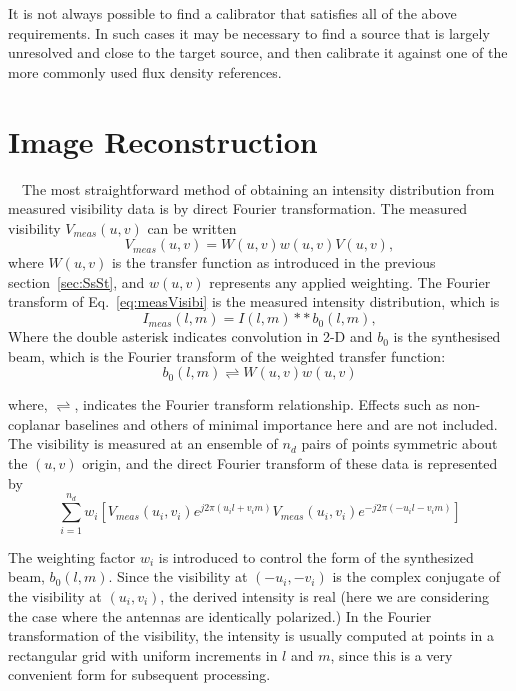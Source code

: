 It is not always possible to find a calibrator that satisfies all of the above requirements. In such cases it may be necessary to find a source that is largely unresolved and close to the target source, and then calibrate it against one of the more commonly used flux density references.

\section{Image Reconstruction}
{~\citep[From][Sec.~10.1~Pgs. 387-394]{thompson2008interferometry}}~The most straightforward method of obtaining an intensity distribution from measured visibility data is by direct Fourier transformation. The measured visibility $V_{meas}(u,v)$ can be written
\begin{equation}
\label{eq:measVisibi}
V_{meas}(u,v) = W(u,v)w(u,v)V(u,v),
\end{equation}
where $W(u,v)$ is the transfer function as introduced in the previous section~\ref{sec:SsSt}, and $w(u,v)$ represents any applied weighting. The Fourier transform of Eq.~\ref{eq:measVisibi} is the measured intensity distribution, which is 
\begin{equation}
\label{measIntensiti}
I_{meas}(l,m) = I(l,m)\ast{\ast}\,{b_0{(l,m)}},
\end{equation}
Where the double asterisk indicates convolution in 2-D and $b_0$ is the synthesised beam, which is the Fourier transform of the weighted transfer function:
\begin{equation}
b_0(l,m) \rightleftharpoons W(u,v)w(u,v)
\end{equation}

where, $\rightleftharpoons$, indicates the Fourier transform relationship. Effects such as non-coplanar baselines and others of minimal importance here and are not included. The visibility is measured at an ensemble of $n_d$ pairs of points symmetric about the $(u,v)$ origin, and the direct Fourier transform of these data is represented by
\begin{equation}
\sum^{n_d}_{i=1}w_i[ V_{meas}(u_i,v_i)e^{j2\pi(u_il+v_im)}V_{meas}(u_i,v_i)e^{-j2\pi(-u_il-v_im)}]
\end{equation}

 The weighting factor $w_i$ is introduced to control the form of the synthesized beam, $b_0(l,m)$. Since the visibility at $(-u_i,-v_i)$ is the complex conjugate of the visibility at $(u_i,v_i)$, the derived intensity is real (here we are considering the case where the antennas are identically polarized.)
 In the Fourier transformation of the visibility, the intensity is usually
computed at points in a rectangular grid with uniform increments in $l$ and $m$, since this is a very convenient form for subsequent processing.\\
